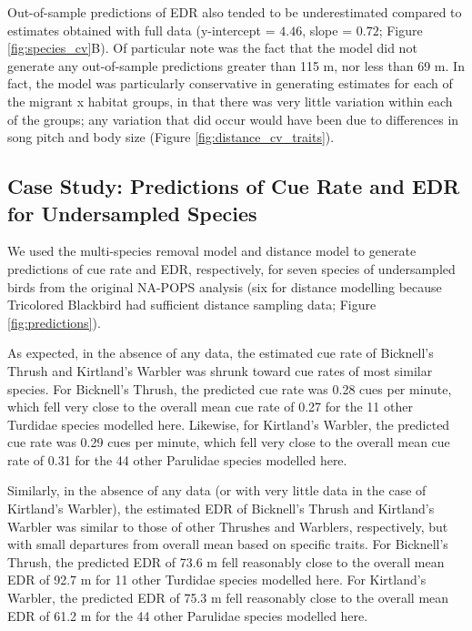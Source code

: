 \documentclass[12pt]{article}
\begin{document}
\par Out-of-sample predictions of EDR also tended to be underestimated compared to estimates obtained with full data (y-intercept = $4.46$, slope = $0.72$; Figure \ref{fig:species_cv}B).
Of particular note was the fact that the model did not generate any out-of-sample predictions greater than 115 m, nor less than 69 m.
In fact, the model was particularly conservative in generating estimates for each of the migrant x habitat groups, in that there was very little variation within each of the groups; any variation that did occur would have been due to differences in song pitch and body size (Figure \ref{fig:distance_cv_traits}).

\subsection{Case Study: Predictions of Cue Rate and EDR for Undersampled Species}

\par We used the multi-species removal model and distance model to generate predictions of cue rate and EDR, respectively, for seven species of undersampled birds from the original NA-POPS analysis (six for distance modelling because Tricolored Blackbird had sufficient distance sampling data; Figure \ref{fig:predictions}).

\par As expected, in the absence of any data, the estimated cue rate of Bicknell’s Thrush and Kirtland’s Warbler was shrunk toward cue rates of most similar species.
For Bicknell's Thrush, the predicted cue rate was 0.28 cues per minute, which fell very close to the overall mean cue rate of 0.27 for the 11 other Turdidae species modelled here.
Likewise, for Kirtland's Warbler, the predicted cue rate was 0.29 cues per minute, which fell very close to the overall mean cue rate of 0.31 for the 44 other Parulidae species modelled here.

\par Similarly, in the absence of any data (or with very little data in the case of Kirtland’s Warbler), the estimated EDR of Bicknell’s Thrush and Kirtland’s Warbler was similar to those of other Thrushes and Warblers, respectively, but with small departures from overall mean based on specific traits.
For Bicknell's Thrush, the predicted EDR of 73.6 m fell reasonably close to the overall mean EDR of 92.7 m for 11 other Turdidae species modelled here.
For Kirtland's Warbler, the predicted EDR of 75.3 m fell reasonably close to the overall mean EDR of 61.2 m for the 44 other Parulidae species modelled here.
\end{document}
